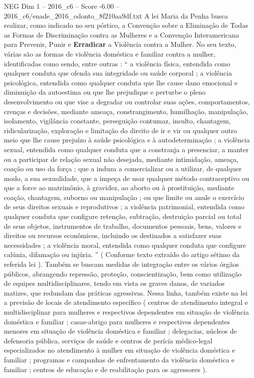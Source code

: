 \begin{textsample}{NEG Dim 1 – 2016\_c6 – Score -6.00 – 2016\_c6/enade\_2016\_odonto\_8f210aa9df.txt}
A lei Maria da Penha busca realizar, como indicado no seu pórtico, a Convenção sobre a Eliminação de Todas as Formas de Discriminação contra as Mulheres e a Convenção Interamericana para Prevenir, Punir e \textbf{Erradicar} a Violência contra a Mulher.
No seu texto, várias são as formas de violência doméstica e familiar contra a mulher, identificadas como sendo, entre outras : “ a violência física, entendida como qualquer conduta que ofenda sua integridade ou saúde corporal ; a violência psicológica, entendida como qualquer conduta que lhe cause dano emocional e diminuição da autoestima ou que lhe prejudique e perturbe o pleno desenvolvimento ou que vise a degradar ou controlar suas ações, comportamentos, crenças e decisões, mediante ameaça, constrangimento, humilhação, manipulação, isolamento, vigilância constante, perseguição contumaz, insulto, chantagem, ridicularização, exploração e limitação do direito de ir e vir ou qualquer outro meio que lhe cause prejuízo à saúde psicológica e à autodeterminação ; a violência sexual, entendida como qualquer conduta que a constranja a presenciar, a manter ou a participar de relação sexual não desejada, mediante intimidação, ameaça, coação ou uso da força ; que a induza a comercializar ou a utilizar, de qualquer modo, a sua sexualidade, que a impeça de usar qualquer método contraceptivo ou que a force ao matrimônio, à gravidez, ao aborto ou à prostituição, mediante coação, chantagem, suborno ou manipulação ; ou que limite ou anule o exercício de seus direitos sexuais e reprodutivos ; a violência patrimonial, entendida como qualquer conduta que configure retenção, subtração, destruição parcial ou total de seus objetos, instrumentos de trabalho, documentos pessoais, bens, valores e direitos ou recursos econômicos, incluindo os destinados a satisfazer suas necessidades ; a violência moral, entendida como qualquer conduta que configure calúnia, difamação ou injúria. ” ( Conforme texto extraído do artigo sétimo da referida lei ).
Também se buscam medidas de integração entre os vários órgãos públicos, abrangendo repressão, proteção, conscientização, bem como utilização de equipes multidisciplinares, tendo em vista os graves danos, de variados matizes, que redundam das práticas agressivas.
Nessa linha, também existe na lei a previsão de locais de atendimento específico ( centros de atendimento integral e multidisciplinar para mulheres e respectivos dependentes em situação de violência doméstica e familiar ; casas-abrigo para mulheres e respectivos dependentes menores em situação de violência doméstica e familiar ; delegacias, núcleos de defensoria pública, serviços de saúde e centros de perícia médico-legal especializados no atendimento à mulher em situação de violência doméstica e familiar ; programas e campanhas de enfrentamento da violência doméstica e familiar ; centros de educação e de reabilitação para os agressores ).

\end{textsample}
